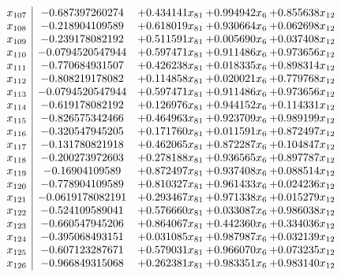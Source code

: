 \documentclass[11pt]{article}
\begin{document}
\[\begin{array}{c| c c@{\hskip 2pt} c@{\hskip 2pt} c@{\hskip 2pt} }
 x_{107}   &  -0.687397260274 & + 0.434141 x_{81} & + 0.994942 x_{6} & + 0.855638 x_{12}\\
 x_{108}   &  -0.218904109589 & + 0.618019 x_{81} & + 0.930664 x_{6} & + 0.062698 x_{12}\\
 x_{109}   &  -0.239178082192 & + 0.511591 x_{81} & + 0.005690 x_{6} & + 0.037408 x_{12}\\
 x_{110}   &  -0.0794520547944 & + 0.597471 x_{81} & + 0.911486 x_{6} & + 0.973656 x_{12}\\
 x_{111}   &  -0.770684931507 & + 0.426238 x_{81} & + 0.018335 x_{6} & + 0.898314 x_{12}\\
 x_{112}   &  -0.808219178082 & + 0.114858 x_{81} & + 0.020021 x_{6} & + 0.779768 x_{12}\\
 x_{113}   &  -0.0794520547944 & + 0.597471 x_{81} & + 0.911486 x_{6} & + 0.973656 x_{12}\\
 x_{114}   &  -0.619178082192 & + 0.126976 x_{81} & + 0.944152 x_{6} & + 0.114331 x_{12}\\
 x_{115}   &  -0.826575342466 & + 0.464963 x_{81} & + 0.923709 x_{6} & + 0.989199 x_{12}\\
 x_{116}   &  -0.320547945205 & + 0.171760 x_{81} & + 0.011591 x_{6} & + 0.872497 x_{12}\\
 x_{117}   &  -0.131780821918 & + 0.462065 x_{81} & + 0.872287 x_{6} & + 0.104847 x_{12}\\
 x_{118}   &  -0.200273972603 & + 0.278188 x_{81} & + 0.936565 x_{6} & + 0.897787 x_{12}\\
 x_{119}   &  -0.16904109589 & + 0.872497 x_{81} & + 0.937408 x_{6} & + 0.088514 x_{12}\\
 x_{120}   &  -0.778904109589 & + 0.810327 x_{81} & + 0.961433 x_{6} & + 0.024236 x_{12}\\
 x_{121}   &  -0.0619178082191 & + 0.293467 x_{81} & + 0.971338 x_{6} & + 0.015279 x_{12}\\
 x_{122}   &  -0.524109589041 & + 0.576660 x_{81} & + 0.033087 x_{6} & + 0.986038 x_{12}\\
 x_{123}   &  -0.660547945206 & + 0.864067 x_{81} & + 0.442360 x_{6} & + 0.334036 x_{12}\\
 x_{124}   &  -0.395068493151 & + 0.031085 x_{81} & + 0.987987 x_{6} & + 0.032139 x_{12}\\
 x_{125}   &  -0.607123287671 & + 0.579031 x_{81} & + 0.966070 x_{6} & + 0.073235 x_{12}\\
 x_{126}   &  -0.966849315068 & + 0.262381 x_{81} & + 0.983351 x_{6} & + 0.983140 x_{12}\\

\end{array}\]
\end{document}
